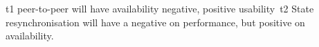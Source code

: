 
t1 peer-to-peer will have availability negative, positive usability\
t2 State resynchronisation will have a negative on performance, but positive on availability.\